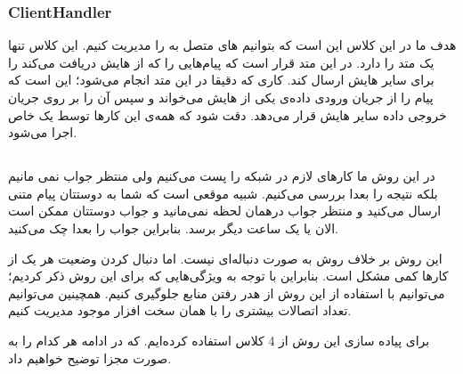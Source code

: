 	\subsubsection{ClientHandler}
	هدف ما در این کلاس این است که بتوانیم 
	های متصل به 
	را مدیریت کنیم. این کلاس تنها یک متد 
	را دارد. در این متد قرار است که 
	پیام‌هایی را که از 
	هایش دریافت می‌کند را برای سایر 
	هایش ارسال کند. کاری که دقیقا در این متد انجام می‌شود؛ این است که پیام را از جریان ورودی داده‌ی یکی از 
	هایش  می‌خواند و سپس آن را بر روی جریان خروجی داده سایر 
	هایش قرار می‌دهد. دقت شود که همه‌ی این کار‌ها توسط یک 
	خاص اجرا می‌شود.


\subsection{}
در این روش ما کار‌های لازم در شبکه را پست می‌کنیم ولی منتظر جواب نمی مانیم بلکه نتیجه را بعدا بررسی می‌کنیم. شبیه موقعی است که شما به دوستتان پیام متنی ارسال می‌کنید و منتظر جواب درهمان لحظه نمی‌مانید و جواب دوستتان ممکن است الان یا یک ساعت دیگر برسد. بنابراین جواب را بعدا چک می‌کنید. 

این روش بر خلاف روش 
به صورت دنباله‌ای نیست. اما دنبال کردن وضعیت هر یک از کار‌ها کمی مشکل است.
بنابراین با توجه به ویژگی‌هایی که برای این روش ذکر کردیم؛ می‌توانیم با استفاده از این روش از هدر رفتن منابع جلوگیری کنیم. همچینین می‌توانیم تعداد اتصالات بیشتری را با همان سخت افزار موجود مدیریت کنیم.

برای پیاده سازی این روش از 4 کلاس استفاده کرده‌ایم. که در ادامه هر کدام را به صورت مجزا توضیح خواهیم داد.
